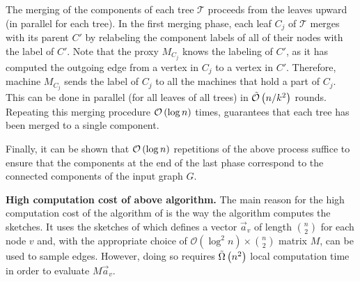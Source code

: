 The merging of the components of each tree $\mathcal{T}$ proceeds from the leaves upward (in parallel for each tree).
In the first merging phase, each leaf $C_j$ of $\mathcal{T}$ merges with its parent $C'$ by relabeling the component
labels of all of their nodes with the label of $C'$. Note that the proxy $M_{C_j}$ knows the labeling of $C'$,
as it has computed the outgoing edge from a vertex in $C_j$ to a vertex in $C'$.
Therefore, machine $M_{C_j}$ sends the label of $C_j$ to all the machines that hold a part of $C_j$.  This can be done in parallel (for all leaves of all trees) in $\tilde{\mathcal{O}}\left(n/k^2\right)$ rounds.
Repeating this merging procedure $\mathcal{O}\left(\log n\right)$ times, guarantees that each tree has been merged to a single component. 

Finally, it can be shown that $\mathcal{O}\left(\log n\right)$ repetitions of the above process suffice to ensure that
the components at the end of the last phase correspond to the connected components of the input graph $G$.

\noindent \textbf{High computation cost of above algorithm.}
The main reason for the high computation cost of the algorithm of \cite{topc18} is the way the algorithm computes
the sketches. It uses the sketches of \cite{JowhariST11,McGregor14} which
defines a vector $\vec{a}_v$ of length $\binom{n}{2}$ for each node $v$ and,
with the appropriate choice of $\mathcal{O}(\log^2{n}) \times \binom{n}{2}$ matrix
$M$, can be used to sample edges. However, doing so requires $\tilde{\Omega}\left(n^2\right)$ local
computation time in order to evaluate $M\vec{a}_v$.

